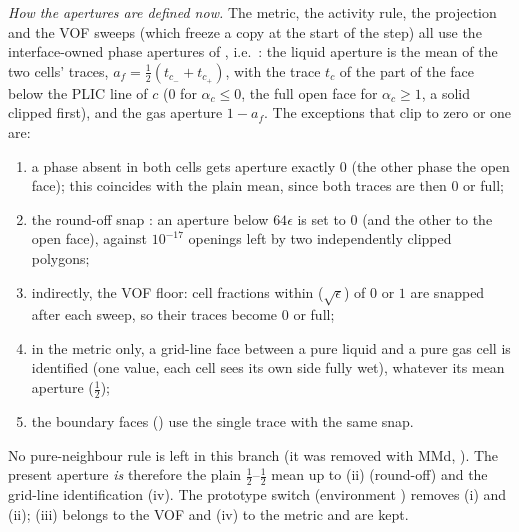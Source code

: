 \emph{How the apertures are defined now.}  The metric, the activity rule, the projection and the
VOF sweeps (which freeze a copy at the start of the step) all use the interface-owned phase
apertures of , i.e.\ : the
liquid aperture is the mean of the two cells' traces, $a_f=\tfrac12(t_{c_-}+t_{c_+})$, with the
trace $t_c$ of  the part of the face below the PLIC line of $c$ ($0$ for
$\alpha_c\le0$, the full open face for $\alpha_c\ge1$, a solid clipped first), and the gas
aperture $1-a_f$.  The exceptions that clip to zero or one are:
\begin{enumerate}[leftmargin=*,itemsep=1pt,label=(\roman*)]
\item a phase absent in both cells gets aperture exactly $0$ (the other phase the open face);
  this coincides with the plain mean, since both traces are then $0$ or full;
\item the round-off snap : an aperture below $64\epsilon$ is set to
  $0$ (and the other to the open face), against $10^{-17}$ openings left by two independently
  clipped polygons;
\item indirectly, the VOF floor: cell fractions within  ($\sqrt\epsilon$) of
  $0$ or $1$ are snapped after each sweep, so their traces become $0$ or full;
\item in the metric only, a grid-line face between a pure liquid and a pure gas cell is
  identified (one value, each cell sees its own side fully wet), whatever its mean aperture
  ($\tfrac12$);
\item the boundary faces () use the single trace with
  the same snap.
\end{enumerate}
No pure-neighbour rule is left in this branch (it was removed with MMd, ).
The present aperture \emph{is} therefore the plain $\tfrac12$--$\tfrac12$ mean up to (ii)
(round-off) and the grid-line identification (iv).  The prototype switch
 (environment ) removes (i) and (ii); (iii)
belongs to the VOF and (iv) to the metric and are kept.

